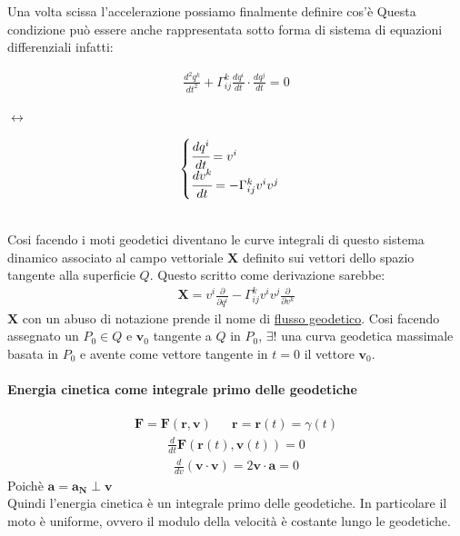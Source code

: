 Una volta scissa l'accelerazione possiamo finalmente definire cos'è 
Questa condizione può essere anche rappresentata sotto forma di sistema di equazioni differenziali infatti:\\
\begin{minipage}{4cm}
    \begin{align*}
        \frac{d^2q^k}{dt^2}+\Gamma^k_{ij}\frac{dq^i}{dt}\cdot \frac{dq^j}{dt}=0
    \end{align*}
\end{minipage}$\longleftrightarrow$
\begin{minipage}{4cm}
    \begin{align*}
        \begin{cases}
            \cfrac{dq^i}{dt}=v^i\\
            \cfrac{dv^k}{dt}=-\Gamma^k_{ij}v^iv^j
        \end{cases}
    \end{align*}
\end{minipage}
\\
Cosi facendo i moti geodetici diventano le curve integrali di questo sistema dinamico associato al campo vettoriale $\mathbf{X}$ definito sui vettori dello spazio tangente alla superficie $Q$. Questo scritto come derivazione sarebbe:
\begin{align*}
    \mathbf{X}=v^i\frac{\partial}{\partial q^i}-\Gamma^k_{ij}v^iv^j\frac{\partial}{\partial v^k}
\end{align*}
$\mathbf{X}$ con un abuso di notazione prende il nome di \underline{flusso geodetico}.
Cosi facendo assegnato un $P_0\in Q$ e $\mathbf{v}_0$ tangente a $Q$ in $P_0$, $\exists!$ una curva geodetica massimale basata in $P_0$ e avente come vettore tangente in $t=0$ il vettore $\mathbf{v}_0$.
\paragraph*{Energia cinetica come integrale primo delle geodetiche}
\begin{align*}
    \mathbf{F}=\mathbf{F}(\mathbf{r},\mathbf{v}) && \mathbf{r}=\mathbf{r}(t)=\gamma(t)
\end{align*}
\begin{align*}
    \frac{d}{dt}\mathbf{F}(\mathbf{r}(t),\mathbf{v}(t))=0
\end{align*}
\begin{align*}
    \frac{d}{dv}(\mathbf{v}\cdot \mathbf{v})=2\mathbf{v}\cdot\mathbf{a}=0
\end{align*}
Poichè $\mathbf{a}=\mathbf{a}_{\mathbf{N}}\perp \mathbf{v}$\\
Quindi l'energia cinetica è un integrale primo delle geodetiche. In particolare il moto è uniforme, ovvero il modulo della velocità è costante lungo le geodetiche.

